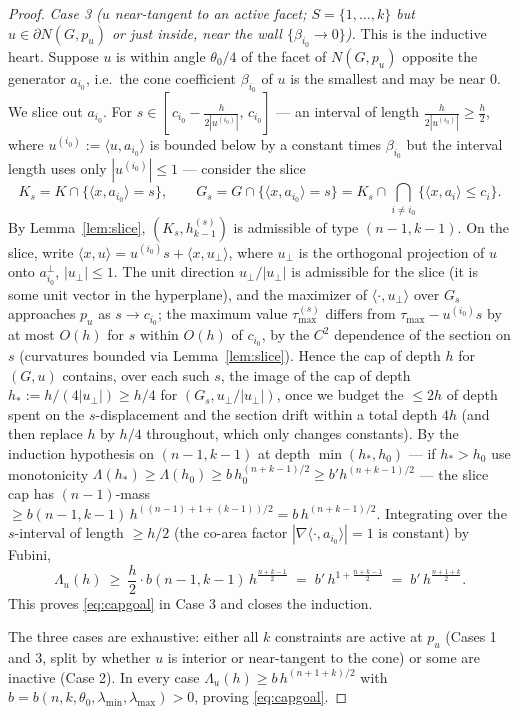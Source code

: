 \documentclass[11pt]{article}
\theoremstyle{definition}
\theoremstyle{remark}
\begin{document}
\begin{proof}
\medskip
\emph{Case 3 ($u$ near-tangent to an active facet; $S=\{1,\dots,k\}$ but $u\in
\partial N(G,p_u)$ or just inside, near the wall $\{\beta_{i_0}\to0\}$).}
This is the inductive heart.  Suppose $u$ is within angle $\theta_0/4$ of the
facet of $N(G,p_u)$ opposite the generator $a_{i_0}$, i.e.\ the cone
coefficient $\beta_{i_0}$ of $u$ is the smallest and may be near $0$.  We slice
out $a_{i_0}$.  For $s\in[\,c_{i_0}-\tfrac{h}{2|u^{(i_0)}|},\,c_{i_0}]$ ---
an interval of length $\tfrac{h}{2|u^{(i_0)}|}\ge\tfrac h2$, where
$u^{(i_0)}:=\langle u,a_{i_0}\rangle$ is bounded below by a constant times
$\beta_{i_0}$ but the interval length uses only $|u^{(i_0)}|\le1$ --- consider
the slice
\[
K_s=K\cap\{\langle x,a_{i_0}\rangle=s\},
\qquad
G_s=G\cap\{\langle x,a_{i_0}\rangle=s\}
=K_s\cap\bigcap_{i\ne i_0}\{\langle x,a_i\rangle\le c_i\}.
\]
By Lemma~\ref{lem:slice}, $(K_s,h_{k-1}^{(s)})$ is admissible of type
$(n-1,k-1)$.  On the slice, write
$\langle x,u\rangle=u^{(i_0)}s+\langle x,u_\perp\rangle$, where
$u_\perp$ is the orthogonal projection of $u$ onto $a_{i_0}^\perp$,
$|u_\perp|\le1$.  The unit direction $u_\perp/|u_\perp|$ is admissible for the
slice (it is some unit vector in the hyperplane), and the maximizer of
$\langle\cdot,u_\perp\rangle$ over $G_s$ approaches $p_u$ as $s\to c_{i_0}$; the
maximum value $\tau_{\max}^{(s)}$ differs from $\tau_{\max}-u^{(i_0)}s$ by at
most $O(h)$ for $s$ within $O(h)$ of $c_{i_0}$, by the $C^2$ dependence of the
section on $s$ (curvatures bounded via Lemma~\ref{lem:slice}).  Hence the cap
of depth $h$ for $(G,u)$ contains, over each such $s$, the image of the cap of
depth $h_*:=h/(4|u_\perp|)\ge h/4$ for $(G_s,u_\perp/|u_\perp|)$, once we budget
the $\le2h$ of depth spent on the $s$-displacement and the section drift within
a total depth $4h$ (and then replace $h$ by $h/4$ throughout, which only changes
constants).  By the induction hypothesis on $(n-1,k-1)$ at depth
$\min(h_*,h_0)$ --- if $h_*>h_0$ use monotonicity $\Lambda(h_*)\ge\Lambda(h_0)
\ge b\,h_0^{(n+k-1)/2}\ge b'h^{(n+k-1)/2}$ --- the slice cap has
$(n-1)$-mass $\ge b(n-1,k-1)\,h^{((n-1)+1+(k-1))/2}=b\,h^{(n+k-1)/2}$.
Integrating over the $s$-interval of length $\ge h/2$ (the co-area factor
$|\nabla\langle\cdot,a_{i_0}\rangle|=1$ is constant) by Fubini,
\[
\Lambda_u(h)\ \ge\ \frac h2\cdot b(n-1,k-1)\,h^{\frac{n+k-1}2}
\;=\;b'\,h^{1+\frac{n+k-1}2}\;=\;b'\,h^{\frac{n+1+k}2}.
\]
This proves \eqref{eq:capgoal} in Case 3 and closes the induction.

\medskip
The three cases are exhaustive: either all $k$ constraints are active at $p_u$
(Cases 1 and 3, split by whether $u$ is interior or near-tangent to the cone)
or some are inactive (Case 2).  In every case
$\Lambda_u(h)\ge b\,h^{(n+1+k)/2}$ with $b=b(n,k,\theta_0,\lambda_{\min},
\lambda_{\max})>0$, proving \eqref{eq:capgoal}.
\end{proof}
\end{document}
